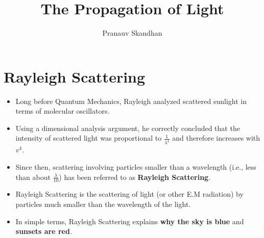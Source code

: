 \documentclass[12pt]{article}
\title{\textbf{The Propagation of Light}}
\author{Pranauv Skandhan}
\date{}
\begin{document}
\maketitle
\tableofcontents
\newpage

\section{Rayleigh Scattering}
\begin{itemize}
\item Long before Quantum Mechanics, Rayleigh analyzed scattered sunlight in terms of molecular oscillators.
\item{Using a dimensional analysis argument, he correctly concluded that the intensity of scattered light was proportional to $\frac{1}{\lambda^4}$ and therefore increases with $v^4$}.
\item{Since then, scattering involving particles smaller than a wavelength (i.e., less than about $\frac{\lambda}{10}$) has been referred to as \textbf{Rayleigh Scattering}.}
\item{Rayleigh Scattering is the scattering of light (or other E.M radiation) by particles much smaller than the wavelength of the light.}
\item{In simple terms, Rayleigh Scattering explains \textbf{why the sky is blue} and \textbf{sunsets are red}.}
\end{itemize}
\end{document}
